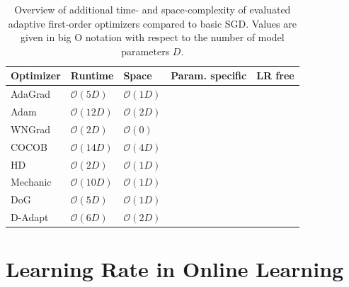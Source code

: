 \documentclass[runningheads]{llncs}
\newcommand{\cmark}{\ding{51}} %
\newcommand{\xmark}{\ding{55}} %
\begin{document}
\begin{table}[ht]
	\centering
	\scriptsize
	\caption{Overview of additional time- and space-complexity of evaluated adaptive first-order optimizers compared to basic SGD. Values are given in big O notation with respect to the number of model parameters $D$.}\label{tab:param_free_optims}
	\begin{tabular}{@{}lllcc@{}}
		\toprule
		Optimizer                & Runtime            & Space             & Param. specific & LR free \\ \midrule
		AdaGrad                  & $\mathcal{O}(5D)$  & $\mathcal{O}(1D)$ & \cmark          & \xmark  \\
		Adam                     & $\mathcal{O}(12D)$ & $\mathcal{O}(2D)$ & \cmark          & \xmark  \\
		WNGrad                   & $\mathcal{O}(2D)$  & $\mathcal{O}(0)$  & \xmark          & \xmark  \\
		COCOB                    & $\mathcal{O}(14D)$ & $\mathcal{O}(4D)$ & \cmark          & \cmark  \\
		HD \footnotemark[1]      & $\mathcal{O}(2D)$  & $\mathcal{O}(1D)$ & \xmark          & \xmark  \\
		Mechanic                 & $\mathcal{O}(10D)$ & $\mathcal{O}(1D)$ & \cmark          & \cmark  \\
		DoG \footnotemark[1]     & $\mathcal{O}(5D)$  & $\mathcal{O}(1D)$ & \xmark          & \cmark  \\
		D-Adapt \footnotemark[1] & $\mathcal{O}(6D)$  & $\mathcal{O}(2D)$ & \xmark          & \cmark  \\
		\bottomrule
	\end{tabular}
\end{table}

\section{Learning Rate in Online Learning}
\end{document}

